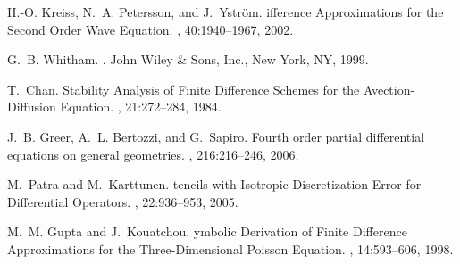 \documentclass[fleqn,12pt,twoside]{article}
\begin{document}
\begin{thebibliography}{10}
H.-O. Kreiss, N.~A. Petersson, and J.~Ystr\"om.
ifference {A}pproximations for the {S}econd {O}rder {W}ave
  {E}quation.
, 40:1940--1967, 2002.

G.~B. Whitham.
.
\newblock John Wiley \& Sons, Inc., New York, NY, 1999.

T.~Chan.
\newblock Stability {A}nalysis of {F}inite {D}ifference {S}chemes for the
  {A}vection-{D}iffusion {E}quation.
, 21:272--284, 1984.

J.~B. Greer, A.~L. Bertozzi, and G.~Sapiro.
\newblock Fourth order partial differential equations on general geometries.
, 216:216--246, 2006.

M.~Patra and M.~Karttunen.
tencils with {I}sotropic {D}iscretization {E}rror for
  {D}ifferential {O}perators.
, 22:936--953, 2005.

M.~M. Gupta and J.~Kouatchou.
ymbolic {D}erivation of {F}inite {D}ifference {A}pproximations for
  the {T}hree-{D}imensional {P}oisson {E}quation.
, 14:593--606, 1998.

\end{thebibliography}
\end{document}
